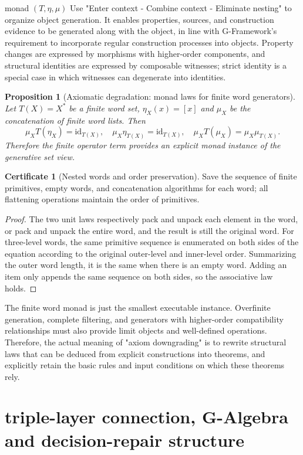 \documentclass[11pt,a4paper]{article}
\theoremstyle{plain}
\newtheorem{proposition}[theorem]{Proposition}
\theoremstyle{definition}
\newtheorem*{certificate}{Certificate}
\theoremstyle{remark}
\begin{document}
\begin{CJK*}
monad $(T,\eta,\mu)$ Use "Enter context - Combine context - Eliminate nesting" to organize object generation. It enables properties, sources, and construction evidence to be generated along with the object, in line with G-Framework's requirement to incorporate regular construction processes into objects. Property changes are expressed by morphisms with higher-order components, and structural identities are expressed by composable witnesses; strict identity is a special case in which witnesses can degenerate into identities. \cite{S09,S10}

\begin{proposition}
[Axiomatic degradation: monad laws for finite word generators]\label{fa:prop-monad}
Let $T(X)=X^*$ be a finite word set, $\eta_X(x)=[x]$ and $\mu_X$ be the concatenation of finite word lists. Then \[
 \mu_XT(\eta_X)=\mathrm{id}_{T(X)},\quad
 \mu_X\eta_{T(X)}=\mathrm{id}_{T(X)},\quad
 \mu_XT(\mu_X)=\mu_X\mu_{T(X)}.
\] Therefore the finite operator term provides an explicit monad instance of the generative set view.\end{proposition}
\begin{certificate}
[Nested words and order preservation]Save the sequence of finite primitives, empty words, and concatenation algorithms for each word; all flattening operations maintain the order of primitives.\end{certificate}
\begin{proof}
The two unit laws respectively pack and unpack each element in the word, or pack and unpack the entire word, and the result is still the original word. For three-level words, the same primitive sequence is enumerated on both sides of the equation according to the original outer-level and inner-level order. Summarizing the outer word length, it is the same when there is an empty word. Adding an item only appends the same sequence on both sides, so the associative law holds.\end{proof}


The finite word monad is just the smallest executable instance. Overfinite generation, complete filtering, and generators with higher-order compatibility relationships must also provide limit objects and well-defined operations. Therefore, the actual meaning of "axiom downgrading" is to rewrite structural laws that can be deduced from explicit constructions into theorems, and explicitly retain the basic rules and input conditions on which these theorems rely.

\section { triple-layer connection, G-Algebra and decision-repair structure }\label{fa:algebra}



\end{CJK*}
\end{document}

